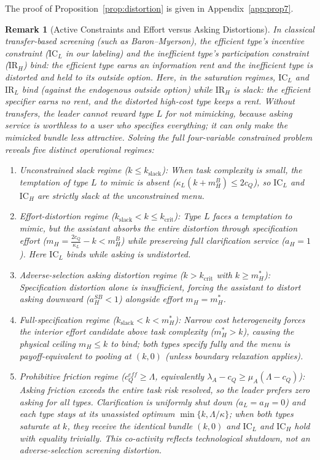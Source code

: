 \documentclass[11pt]{article}
\newtheorem{remark}{Remark}
\begin{document}
The proof of Proposition~\ref{prop:distortion} is given in Appendix~\ref{app:prop7}.

\begin{remark}[Active Constraints and Effort versus Asking Distortions]
\label{rmk:active-constraints}
In classical transfer-based screening (such as Baron--Myerson), the efficient type's incentive constraint ($\text{IC}_L$ in our labeling) and the inefficient type's participation constraint ($\text{IR}_H$) bind: the efficient type earns an information rent and the inefficient type is distorted and held to its outside option. Here, in the saturation regimes, $\text{IC}_L$ and $\text{IR}_L$ bind (against the endogenous outside option) while $\text{IR}_H$ is slack: the efficient specifier earns no rent, and the distorted high-cost type keeps a rent. Without transfers, the leader cannot reward type $L$ for not mimicking, because asking service is worthless to a user who specifies everything; it can only make the mimicked bundle less attractive. Solving the full four-variable constrained problem reveals five distinct operational regimes:
\begin{enumerate}[leftmargin=*]
\item \emph{Unconstrained slack regime ($k \le k_{\text{slack}}$):} When task complexity is small, the temptation of type $L$ to mimic is absent ($\kappa_L(k + m_H^B) \le 2 c_Q$), so $\text{IC}_L$ and $\text{IC}_H$ are strictly slack at the unconstrained menu.
\item \emph{Effort-distortion regime ($k_{\text{slack}} < k \le k_{\text{crit}}$):} Type $L$ faces a temptation to mimic, but the assistant absorbs the entire distortion through specification effort ($m_H = \frac{2c_Q}{\kappa_L} - k < m_H^B$) while preserving full clarification service ($a_H = 1$). Here $\text{IC}_L$ binds while asking is undistorted.
\item \emph{Adverse-selection asking distortion regime ($k > k_{\text{crit}}$ with $k \ge m_H^*$):} Specification distortion alone is insufficient, forcing the assistant to distort asking downward ($a_H^{SB} < 1$) alongside effort $m_H = m_H^*$.
\item \emph{Full-specification regime ($k_{\text{slack}} < k < m_H^*$):} Narrow cost heterogeneity forces the interior effort candidate above task complexity ($m_H^* > k$), causing the physical ceiling $m_H \le k$ to bind; both types specify fully and the menu is payoff-equivalent to pooling at $(k, 0)$ (unless boundary relaxation applies).
\item \emph{Prohibitive friction regime ($c_Q^{eff} \ge \Lambda$, equivalently $\lambda_A - c_Q \ge \mu_A(\Lambda - c_Q)$):} Asking friction exceeds the entire task risk resolved, so the leader prefers zero asking for all types. Clarification is uniformly shut down ($a_L = a_H = 0$) and each type stays at its unassisted optimum $\min\{k, \Lambda/\kappa\}$; when both types saturate at $k$, they receive the identical bundle $(k, 0)$ and $\text{IC}_L$ and $\text{IC}_H$ hold with equality trivially. This co-activity reflects technological shutdown, not an adverse-selection screening distortion.
\end{enumerate}
\end{remark}
\end{document}

